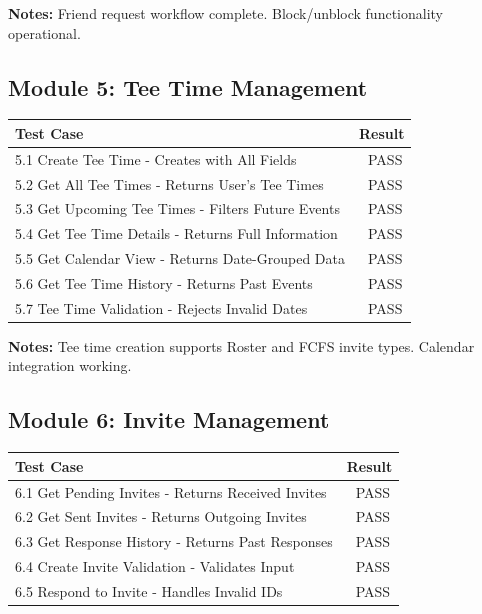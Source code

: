\documentclass[11pt,a4paper]{article}
\newcommand{\pass}{\textcolor{pass}{\checkmark\ PASS}}
\begin{document}
\vspace{0.5cm}
\textbf{Notes:} Friend request workflow complete. Block/unblock functionality operational.

\subsection{Module 5: Tee Time Management}

\begin{tabular}{|p{10cm}|c|}
\hline
\textbf{Test Case} & \textbf{Result} \\
\hline
5.1 Create Tee Time - Creates with All Fields & \pass \\
\hline
5.2 Get All Tee Times - Returns User's Tee Times & \pass \\
\hline
5.3 Get Upcoming Tee Times - Filters Future Events & \pass \\
\hline
5.4 Get Tee Time Details - Returns Full Information & \pass \\
\hline
5.5 Get Calendar View - Returns Date-Grouped Data & \pass \\
\hline
5.6 Get Tee Time History - Returns Past Events & \pass \\
\hline
5.7 Tee Time Validation - Rejects Invalid Dates & \pass \\
\hline
\end{tabular}

\vspace{0.5cm}
\textbf{Notes:} Tee time creation supports Roster and FCFS invite types. Calendar integration working.

\subsection{Module 6: Invite Management}

\begin{tabular}{|p{10cm}|c|}
\hline
\textbf{Test Case} & \textbf{Result} \\
\hline
6.1 Get Pending Invites - Returns Received Invites & \pass \\
\hline
6.2 Get Sent Invites - Returns Outgoing Invites & \pass \\
\hline
6.3 Get Response History - Returns Past Responses & \pass \\
\hline
6.4 Create Invite Validation - Validates Input & \pass \\
\hline
6.5 Respond to Invite - Handles Invalid IDs & \pass \\
\hline
\end{tabular}
\end{document}
